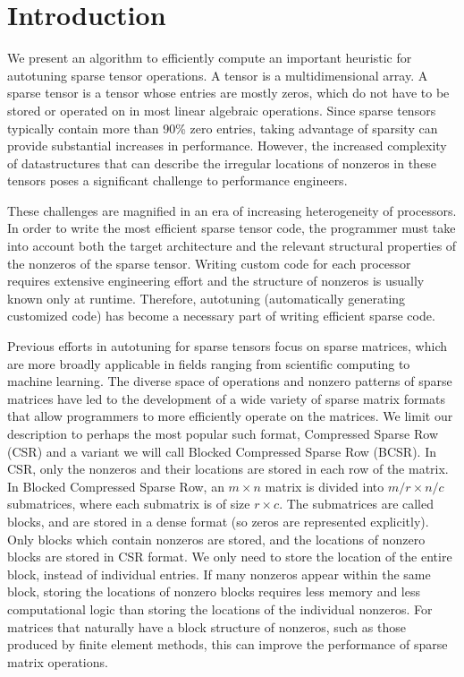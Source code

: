 
\section{Introduction}

  We present an algorithm to efficiently compute an important heuristic for autotuning sparse tensor operations. A tensor is a multidimensional array. A sparse tensor is a tensor whose entries are mostly zeros, which do not have to be stored or operated on in most linear algebraic operations. Since sparse tensors typically contain more than 90\% zero entries, taking advantage of sparsity can provide substantial increases in performance. However, the increased complexity of datastructures that can describe the irregular locations of nonzeros in these tensors poses a significant challenge to performance engineers.

  These challenges are magnified in an era of increasing heterogeneity of processors. In order to write the most efficient sparse tensor code, the programmer must take into account both the target architecture and the relevant structural properties of the nonzeros of the sparse tensor. Writing custom code for each processor requires extensive engineering effort and the structure of nonzeros is usually known only at runtime. Therefore, autotuning (automatically generating customized code) has become a necessary part of writing efficient sparse code.

  Previous efforts in autotuning for sparse tensors focus on sparse matrices, which are more broadly applicable in fields ranging from scientific computing to machine learning. The diverse space of operations and nonzero patterns of sparse matrices have led to the development of a wide variety of sparse matrix formats that allow programmers to more efficiently operate on the matrices. We limit our description to perhaps the most popular such format, Compressed Sparse Row (CSR) and a variant we will call Blocked Compressed Sparse Row (BCSR). In CSR, only the nonzeros and their locations are stored in each row of the matrix. In Blocked Compressed Sparse Row, an $m \times n$ matrix is divided into $m/r \times n/c$ submatrices, where each submatrix is of size $r \times c$. The submatrices are called blocks, and are stored in a dense format (so zeros are represented explicitly). Only blocks which contain nonzeros are stored, and the locations of nonzero blocks are stored in CSR format. We only need to store the location of the entire block, instead of individual entries. If many nonzeros appear within the same block, storing the locations of nonzero blocks requires less memory and less computational logic than storing the locations of the individual nonzeros. For matrices that naturally have a block structure of nonzeros, such as those produced by finite element methods, this can improve the performance of sparse matrix operations.

